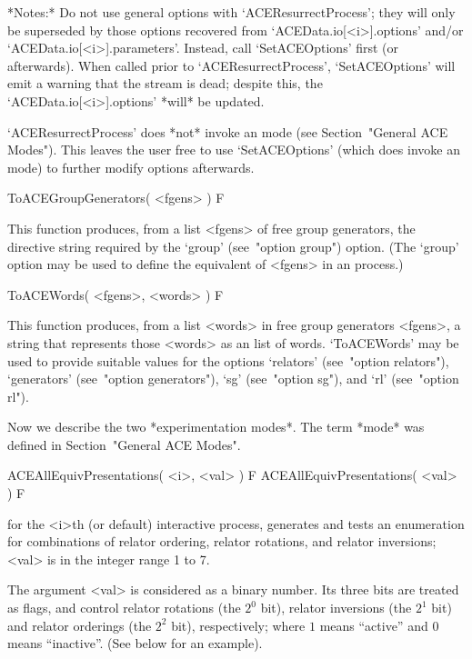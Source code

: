 *Notes:*
Do not use general {\ACE}  options  with  `ACEResurrectProcess';  they
will  only   be   superseded   by   those   options   recovered   from
`ACEData.io[<i>].options'     and/or     `ACEData.io[<i>].parameters'.
Instead, call `SetACEOptions' first (or afterwards). When called prior
to `ACEResurrectProcess', `SetACEOptions' will emit a warning that the
stream is dead; despite this, the `ACEData.io[<i>].options' *will*  be
updated.

`ACEResurrectProcess'  does  *not*  invoke   an   {\ACE}   mode   (see
Section~"General ACE  Modes").  This  leaves  the  user  free  to  use
`SetACEOptions' (which does invoke an {\ACE} mode) to  further  modify
options afterwards.

\>ToACEGroupGenerators( <fgens> ) F

This function produces, from a  {\GAP}  list  <fgens>  of  free  group
generators, the  {\ACE}  directive  string  required  by  the  `group'
(see~"option group") option. (The `group' option may be used to define
the equivalent of <fgens> in an {\ACE} process.)

\>ToACEWords( <fgens>, <words> ) F

This function produces, from a  {\GAP}  list  <words>  in  free  group
generators <fgens>, a string  that  represents  those  <words>  as  an
{\ACE} list of words. `ToACEWords' may be  used  to  provide  suitable
values   for   the   options   `relators'   (see~"option   relators"),
`generators' (see~"option generators"), `sg'  (see~"option  sg"),  and
`rl' (see~"option rl").


Now we describe the two *experimentation modes*. The term  *mode*  was
defined in Section~"General ACE Modes".

\>ACEAllEquivPresentations( <i>, <val> ) F
\>ACEAllEquivPresentations( <val> ) F

for the <i>th (or default) interactive {\ACE} process,  generates  and
tests an enumeration for combinations  of  relator  ordering,  relator
rotations, and relator inversions; <val> is in the integer range 1  to
7.

The argument <val> is considered as a binary number.  Its  three  bits
are treated as flags, and control relator rotations (the  $2^0$  bit),
relator inversions (the $2^1$ bit) and relator  orderings  (the  $2^2$
bit),  respectively;  where  $1$  means  ``active''  and   $0$   means
``inactive''. (See below for an example).

